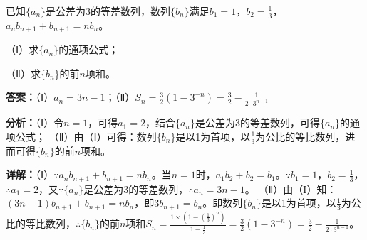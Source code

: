 \begin{question}[points=12]
已知$\{a_n\}$是公差为3的等差数列，数列$\{b_n\}$满足$b_1=1$，$b_2=\frac{1}{3}$，$a_nb_{n+1}+b_{n+1}=nb_n$。

（Ⅰ）求$\{a_n\}$的通项公式；

（Ⅱ）求$\{b_n\}$的前$n$项和。
\begin{solution}
\textbf{答案：}（Ⅰ）$a_n=3n-1$；（Ⅱ）$S_n=\frac{3}{2}(1-3^{-n})=\frac{3}{2}-\frac{1}{2\cdot3^{n-1}}$

\textbf{分析：}（Ⅰ）令$n=1$，可得$a_1=2$，结合$\{a_n\}$是公差为3的等差数列，可得$\{a_n\}$的通项公式；
（Ⅱ）由（Ⅰ）可得：数列$\{b_n\}$是以1为首项，以$\frac{1}{3}$为公比的等比数列，进而可得$\{b_n\}$的前$n$项和。

\textbf{详解：}（Ⅰ）$\because a_nb_{n+1}+b_{n+1}=nb_n$。当$n=1$时，$a_1b_2+b_2=b_1$。$\because b_1=1$，$b_2=\frac{1}{3}$，$\therefore a_1=2$，又$\because \{a_n\}$是公差为3的等差数列，$\therefore a_n=3n-1$。
（Ⅱ）由（I）知：$(3n-1)b_{n+1}+b_{n+1}=nb_n$，即$3b_{n+1}=b_n$。即数列$\{b_n\}$是以1为首项，以$\frac{1}{3}$为公比的等比数列，$\therefore \{b_n\}$的前$n$项和$S_n=\frac{1\times(1-(\frac{1}{3})^n)}{1-\frac{1}{3}}=\frac{3}{2}(1-3^{-n})=\frac{3}{2}-\frac{1}{2\cdot3^{n-1}}$。
\end{solution}
\end{question}

